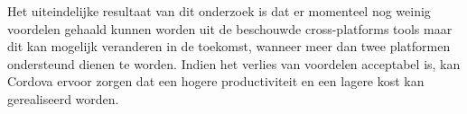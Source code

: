 \documentclass[a4paper]{IEEEconf}
\begin{document}
Het uiteindelijke resultaat van dit onderzoek is dat er momenteel nog weinig voordelen gehaald kunnen worden uit de beschouwde cross-platforms tools maar dit kan mogelijk veranderen in de toekomst, wanneer meer dan twee platformen ondersteund dienen te worden. Indien het verlies van voordelen acceptabel is, kan Cordova ervoor zorgen dat een hogere productiviteit en een lagere kost kan gerealiseerd worden.

\printbibliography
\end{document}
